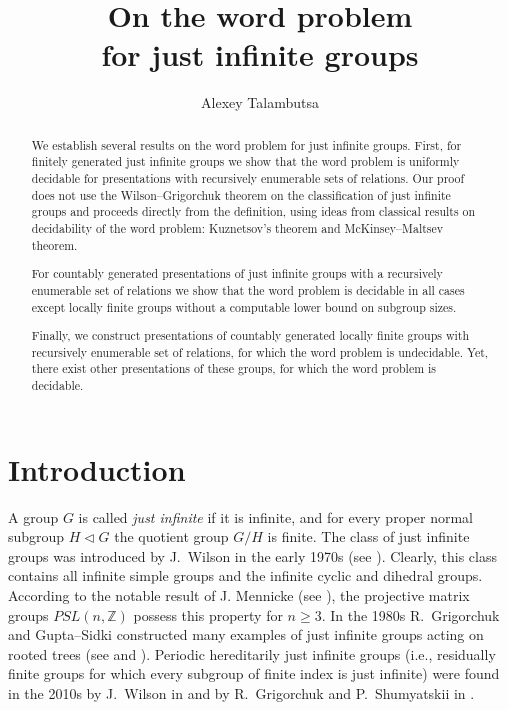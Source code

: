 \documentclass[12pt,a4paper]{amsart}
\title[On the word problem for just infinite groups]{On the word problem \\ for just infinite groups }
\author{Alexey Talambutsa}
\begin{document}
\begin{abstract}
We establish several results on the word problem for just infinite groups. 
First, for finitely generated just infinite groups we show that the word problem is uniformly decidable for presentations with recursively enumerable sets of relations. Our proof does not use the Wilson--Grigorchuk theorem on the classification of just infinite groups and proceeds directly from the definition, using ideas from classical results on decidability of the word problem: Kuznetsov's theorem and McKinsey--Maltsev theorem.

For countably generated presentations of just infinite groups with a recursively enumerable set of relations we show that the word problem is decidable in all cases except locally finite groups without a computable lower bound on subgroup sizes.  %

Finally, we construct presentations of countably generated locally finite groups with recursively enumerable set of relations, for which the word problem is undecidable. Yet, there exist other presentations of these groups, for which the word problem is decidable.

\end{abstract}

\maketitle

\section{Introduction}

A group $G$ is called \emph{just infinite} if it is infinite, and for every proper normal subgroup $H\triangleleft G$ the quotient group $G/H$ is finite. The class of just infinite groups was introduced by J.~Wilson in the early 1970s (see \cite{Wilson1971}). Clearly, this class contains all infinite simple groups and the infinite cyclic and dihedral groups. According to the notable result of J. Mennicke (see \cite{Mennicke1965}), the projective matrix groups $PSL(n,\mathbb{Z})$ possess this property for $n\geq 3$. In the 1980s R.~Grigorchuk and Gupta--Sidki constructed many examples of just infinite groups acting on rooted trees (see \cite{Grigorchuk1980, Grigorchuk1985} and \cite{GuptaSidki1983}). Periodic hereditarily just infinite groups (i.e., residually finite groups for which every subgroup of finite index is just infinite) were found in the 2010s by J.~Wilson in \cite{Wilson2010} and by R.~Grigorchuk and P.~Shumyatskii in \cite{GriShum2017}.
\end{document}
